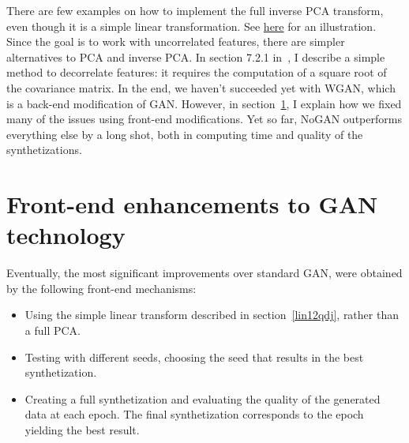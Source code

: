 \documentclass[oneside,10pt]{book}
\begin{document}
There are few examples on how to implement the full inverse PCA transform, even though it is a simple linear transformation. See
 \href{https://stats.stackexchange.com/questions/229092/how-to-reverse-pca-and-reconstruct-original-variables-from-several-principal-com}{here} for
 an illustration.  Since the goal is to work with uncorrelated features, there are simpler alternatives to PCA and inverse PCA. In section
 7.2.1 in~\cite{vgelsevier}, I describe a simple method to decorrelate features: it requires the computation of a square root of the
 covariance matrix. In the end, we haven't succeeded yet with WGAN, which is a back-end modification of GAN. However, in section~\ref{ou6xkj},
 I explain how we fixed many of the issues using front-end modifications. Yet so far, NoGAN outperforms everything else by a long shot,
 both in computing time and quality of the synthetizations.

\section{Front-end enhancements to GAN technology}\label{ou6xkj}

Eventually, the most significant improvements over standard GAN, were obtained by the following front-end mechanisms: \vspace{1ex}

\begin{itemize}
\item Using the simple linear transform described in section~\ref{lin12qdj}, rather than a full PCA.
\item Testing with different seeds, choosing the seed that results in the best synthetization.
\item Creating a full synthetization and evaluating the quality of the generated data at each epoch.
 The final synthetization corresponds to the epoch yielding the best result. 
\end{itemize}\vspace{1ex}
\end{document}
